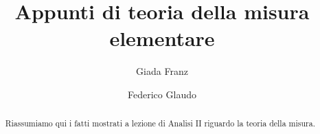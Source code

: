 \documentclass[a4paper,12pt]{article}
\title{Appunti di teoria della misura elementare}
\author{Giada Franz \and Federico Glaudo}
\begin{document}
\maketitle


\begin{abstract}
	Riassumiamo qui i fatti mostrati a lezione di Analisi II riguardo la teoria della misura.
\end{abstract}
\clearpage



\end{document}
